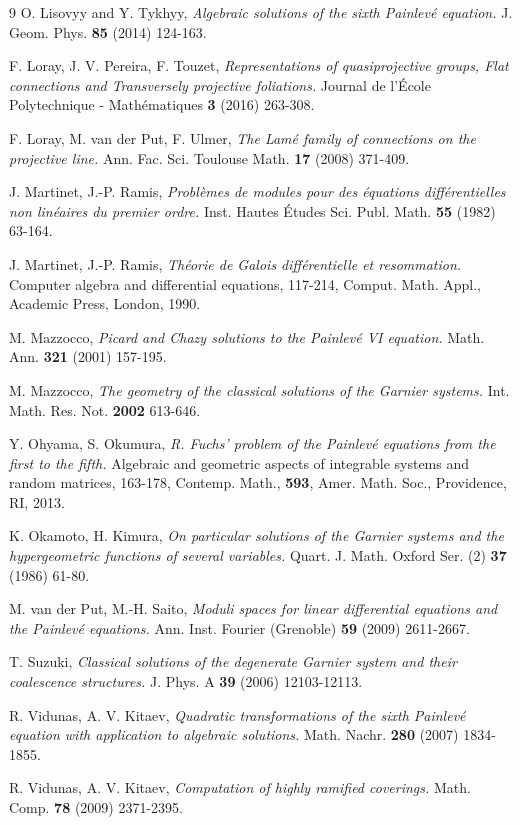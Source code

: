 \documentclass[12]{amsart}
\begin{document}
\begin{thebibliography}{9}
{\sc O. Lisovyy and Y. Tykhyy},  
\emph{Algebraic solutions of the sixth Painlev\'e equation.} 
J. Geom. Phys. {\bf 85} (2014) 124-163. 

{\sc F. Loray, J. V. Pereira, F. Touzet},
\emph{ Representations of quasiprojective groups, Flat connections and Transversely projective foliations.}
Journal de l'\'Ecole Polytechnique - Math\'ematiques {\bf 3} (2016) 263-308.

{\sc F. Loray, M. van der Put, F. Ulmer},
\emph{The Lam{\'e} family of connections on the projective line.}
Ann. Fac. Sci. Toulouse Math. {\bf 17} (2008) 371-409. 

{\sc J. Martinet, J.-P. Ramis},
\emph{Probl\`emes de modules pour des \'equations diff\'erentielles non lin\'eaires du premier ordre.}
Inst. Hautes \'Etudes Sci. Publ. Math. {\bf 55} (1982) 63-164. 

{\sc J. Martinet, J.-P. Ramis},
\emph{Th\'eorie de Galois diff\'erentielle et resommation.} 
Computer algebra and differential equations, 117-214,
Comput. Math. Appl., Academic Press, London, 1990. 

{\sc M. Mazzocco},
\emph{Picard and Chazy solutions to the Painlev\'e VI equation.}
Math. Ann. {\bf 321} (2001) 157-195. 

{\sc M. Mazzocco}, 
\emph{The geometry of the classical solutions of the Garnier systems.}
Int. Math. Res. Not. {\bf 2002} 613-646.

{\sc Y. Ohyama, S. Okumura},
\emph{R. Fuchs' problem of the Painlev\'e equations from the first to the fifth.} 
Algebraic and geometric aspects of integrable systems and random matrices, 163-178, 
Contemp. Math., {\bf 593}, Amer. Math. Soc., Providence, RI, 2013.

{\sc K. Okamoto, H. Kimura},
\emph{On particular solutions of the Garnier systems and the hypergeometric functions of several variables.}
Quart. J. Math. Oxford Ser. (2) {\bf 37} (1986) 61-80. 

{\sc M. van der Put, M.-H. Saito}, 
\emph{Moduli spaces for linear differential equations and the Painlev\'e equations.} 
Ann. Inst. Fourier (Grenoble) {\bf 59} (2009) 2611-2667. 

{\sc T. Suzuki},
\emph{Classical solutions of the degenerate Garnier system and their coalescence structures.}
J. Phys. A {\bf 39} (2006) 12103-12113.

{\sc R. Vidunas, A. V. Kitaev}, 
\emph{Quadratic transformations of the sixth Painlev\'e equation with application to algebraic solutions.}
Math. Nachr. {\bf 280} (2007) 1834-1855. 

{\sc R. Vidunas, A. V. Kitaev}, 
\emph{Computation of highly ramified coverings.} 
Math. Comp. {\bf 78} (2009) 2371-2395.

\end{thebibliography}
\end{document}
